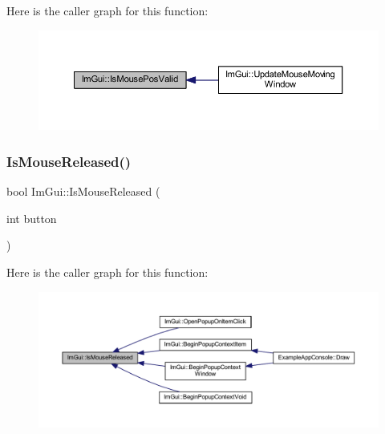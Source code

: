 Here is the caller graph for this function\+:
\nopagebreak
\begin{figure}[H]
\begin{center}
\leavevmode
\includegraphics[width=350pt]{namespace_im_gui_a22d482190e8f549d5904aded1c6f7778_icgraph}
\end{center}
\end{figure}
\mbox{\label{namespace_im_gui_aef586112e8d1eb26ce28198d9efe9bba}} 
\subsubsection{\texorpdfstring{Is\+Mouse\+Released()}{IsMouseReleased()}}
{\footnotesize\ttfamily bool Im\+Gui\+::\+Is\+Mouse\+Released (\begin{DoxyParamCaption}\item[{int}]{button }\end{DoxyParamCaption})}

Here is the caller graph for this function\+:
\nopagebreak
\begin{figure}[H]
\begin{center}
\leavevmode
\includegraphics[width=350pt]{namespace_im_gui_aef586112e8d1eb26ce28198d9efe9bba_icgraph}
\end{center}
\end{figure}
\mbox{\label{namespace_im_gui_a6e17ebbbba6b83702bb1059aee98e420}} 
